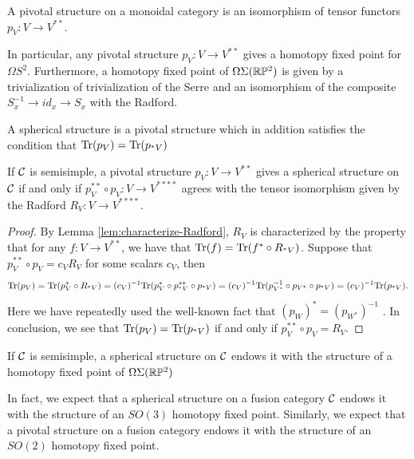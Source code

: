 \documentclass{amsart}
\begin{document}
\begin{definition}
A pivotal structure on a monoidal category is an isomorphism of tensor functors $p_V: V \rightarrow V^{**}$.   
\end{definition}

In particular, any pivotal structure $p_V: V \rightarrow V^{**}$  gives a homotopy fixed point for $\Omega S^2$.  Furthermore, a homotopy fixed point of $\Omega \Sigma (\mathbb R \mathbb P^2)$ is given by a trivialization of trivialization of the Serre and an isomorphism of the composite $S_{x}^{-1} \rightarrow id_x \rightarrow S_x$ with the Radford.  

\begin{definition}
A spherical structure is a pivotal structure which in addition satisfies the condition that $\mathrm{Tr}(p_V) = \mathrm{Tr}(p_{{}^*V})$
\end{definition}

\begin{lemma}
If $\mathcal C$ is semisimple, a pivotal structure $p_V: V \rightarrow V^{**}$ gives a spherical structure on $\mathcal C$ if and only if $p_V^{**} \circ p_V: V \rightarrow V^{****}$ agrees with the tensor isomorphism given by the Radford $R_V: V \rightarrow V^{****}$.
\end{lemma}
\begin{proof}
By Lemma \ref{lem:characterize-Radford}, $R_V$ is characterized by the property that for any $f: V \rightarrow V^{**}$, we have that $\mathrm{Tr}(f) = \mathrm{Tr}(f^* \circ R_{{}^*V})$.  Suppose that $p_V^{**} \circ p_V = c_V R_V$ for some scalars $c_V$, then
$$\mathrm{Tr}(p_V) = \mathrm{Tr}(p_V^* \circ R_{{}^*V}) = (c_V)^{-1}\mathrm{Tr}(p_V^* \circ p_{{}^*V}^{**} \circ p_{{}^*V}) = (c_V)^{-1}\mathrm{Tr}(p_{V^*}^{-1} \circ p_{V^*} \circ p_{{}^*V}) = (c_V)^{-1}\mathrm{Tr}(p_{{}^*V}).$$
Here we have repeatedly used the well-known fact that $(p_W)^* = (p_{W^*})^{-1}$ \cite[Lemma 4.11]{0908.3347}.  In conclusion, we see that $\mathrm{Tr}(p_V) = \mathrm{Tr}(p_{{}^*V})$ if and only if $p_V^{**} \circ p_V = R_V$.
\end{proof}

\begin{corollary}
If $\mathcal C$ is semisimple, a spherical structure on $\mathcal C$ endows it with the structure of a homotopy fixed point of $\Omega \Sigma (\mathbb R \mathbb P^2)$
\end{corollary}


\begin{remark}
In fact, we expect that a spherical structure on a fusion category $\mathcal C$ endows it with the structure of an $SO(3)$ homotopy fixed point.   Similarly, we expect that a pivotal structure on a fusion category endows it with the structure of an $SO(2)$ homotopy fixed point. 
\end{remark}
\end{document}

